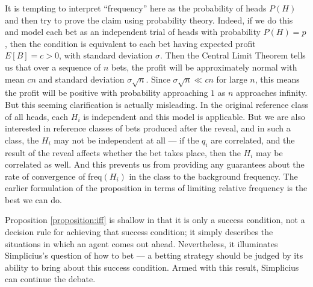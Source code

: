 \documentclass[letterpaper,12pt]{article}
\begin{document}
It is tempting to interpret ``frequency'' here as the probability of heads $P(H)$ and then try to prove the claim using probability theory. Indeed, if we do this and model each bet as an independent trial of heads with probability $P(H) = p$, then the condition is equivalent to each bet having expected profit $E[B] = c > 0$, with standard deviation $\sigma$. Then the Central Limit Theorem tells us that over a sequence of $n$ bets, the profit will be approximately normal with mean $cn$ and standard deviation $\sigma \sqrt{n}$. Since $\sigma \sqrt{n} \ll cn$ for large $n$, this means the profit will be positive with probability approaching $1$ as $n$ approaches infinity. But this seeming clarification is actually misleading. In the original reference class of all heads, each $H_i$ is independent and this model is applicable. But we are also interested in reference classes of bets produced after the reveal, and in such a class, the $H_i$ may not be independent at all --- if the $q_i$ are correlated, and the result of the reveal affects whether the bet takes place, then the $H_i$ may be correlated as well. And this prevents us from providing any guarantees about the rate of convergence of freq$(H_i)$ in the class to the background frequency. The earlier formulation of the proposition in terms of limiting relative frequency is the best we can do.

Proposition \ref{proposition:iff} is shallow in that it is only a success condition, not a decision rule for achieving that success condition; it simply describes the situations in which an agent comes out ahead. Nevertheless, it illuminates Simplicius's question of how to bet --- a betting strategy should be judged by its ability to bring about this success condition. Armed with this result, Simplicius can continue the debate.
\end{document}
